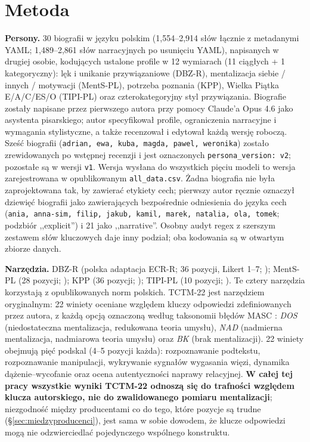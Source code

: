 \documentclass[11pt,a4paper]{article}
\begin{document}
\section{Metoda}

\textbf{Persony.} 30 biografii w języku polskim (1{,}554--2{,}914 słów łącznie z metadanymi YAML; 1{,}489--2{,}861 słów narracyjnych po usunięciu YAML), napisanych w drugiej osobie, kodujących ustalone profile w 12 wymiarach (11 ciągłych + 1 kategoryczny): lęk i unikanie przywiązaniowe (DBZ-R), mentalizacja siebie / innych / motywacji (MentS-PL), potrzeba poznania (KPP), Wielka Piątka E/A/C/ES/O (TIPI-PL) oraz czterokategoryjny styl przywiązania. Biografie zostały napisane przez pierwszego autora przy pomocy Claude'a Opus 4.6 jako asystenta pisarskiego; autor specyfikował profile, ograniczenia narracyjne i wymagania stylistyczne, a także recenzował i edytował każdą wersję roboczą. Sześć biografii (\texttt{adrian, ewa, kuba, magda, pawel, weronika}) zostało zrewidowanych po wstępnej recenzji i jest oznaczonych \texttt{persona\_version: v2}; pozostałe są w wersji \texttt{v1}. Wersja wysłana do wszystkich pięciu modeli to wersja zarejestrowana w opublikowanym \texttt{all\_data.csv}. Żadna biografia nie była zaprojektowana tak, by zawierać etykiety cech; pierwszy autor ręcznie oznaczył dziewięć biografii jako zawierających bezpośrednie odniesienia do języka cech (\texttt{ania, anna-sim, filip, jakub, kamil, marek, natalia, ola, tomek}; podzbiór ,,explicit'') i 21 jako ,,narrative''. Osobny audyt regex z szerszym zestawem słów kluczowych daje inny podział; oba kodowania są w otwartym zbiorze danych.

\textbf{Narzędzia.} DBZ-R (polska adaptacja ECR-R; 36 pozycji, Likert 1--7; \citealt{lubiewska2016}); MentS-PL (28 pozycji; \citealt{janczak2021}); KPP (36 pozycji; \citealt{matusz2011}); TIPI-PL (10 pozycji; \citealt{sorokowska2014}). Te cztery narzędzia korzystają z opublikowanych norm polskich. TCTM-22 jest narzędziem oryginalnym: 22 winiety oceniane względem kluczy odpowiedzi zdefiniowanych przez autora, z każdą opcją oznaczoną według taksonomii błędów MASC \cite{dziobek2006}: \emph{DOS} (niedostateczna mentalizacja, redukowana teoria umysłu), \emph{NAD} (nadmierna mentalizacja, nadmiarowa teoria umysłu) oraz \emph{BK} (brak mentalizacji). 22 winiety obejmują pięć podskal (4--5 pozycji każda): rozpoznawanie podtekstu, rozpoznawanie manipulacji, wykrywanie sygnałów wygasania więzi, dynamika dążenie--wycofanie oraz ocena autentyczności naprawy relacyjnej. \textbf{W całej tej pracy wszystkie wyniki TCTM-22 odnoszą się do trafności względem klucza autorskiego, nie do zwalidowanego pomiaru mentalizacji}; niezgodność między producentami co do tego, które pozycje są trudne (\S\ref{sec:miedzyproducenci}), jest sama w sobie dowodem, że klucze odpowiedzi mogą nie odzwierciedlać pojedynczego wspólnego konstruktu.
\end{document}
